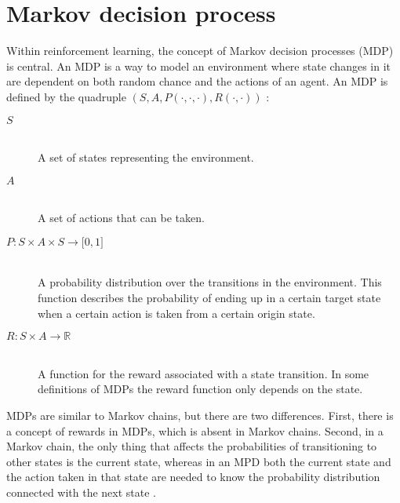 \section{Markov decision process}
\label{sec:mdps}

Within reinforcement learning, the concept of Markov decision processes (MDP) is central. An MDP is a way to model an environment where state changes in it are dependent on both random chance and the actions of an agent. An MDP is defined by the quadruple $\left( S, A, P( \cdot , \cdot, \cdot ) , R( \cdot , \cdot ) \right)$ \parencite{altman2002applications}:

\begin{description}
\item[$S$] \hfill \\ 
    A set of states representing the environment.

\item[$A$] \hfill \\ 
    A set of actions that can be taken.

\item[$P \colon S \times A \times S \to \mathbb \lbrack0, 1\rbrack$] \hfill \\ 
    A probability distribution over the transitions in the environment. This
    function describes the probability of ending up in a certain target state
    when a certain action is taken from a certain origin state. 

\item[$R \colon S \times A \to \mathbb{R}$] \hfill \\ 
    A function for the reward associated with a state transition. In some
    definitions of MDPs the reward function only depends on the state.

\end{description}

MDPs are similar to Markov chains, but there are two differences. First, there
is a concept of rewards in MDPs, which is absent in Markov chains. Second, in a
Markov chain, the only thing that affects the probabilities of transitioning to
other states is the current state, whereas in an MPD both the current state and
the action taken in that state are needed to know the probability distribution
connected with the next state \parencite{altman2002applications}.


